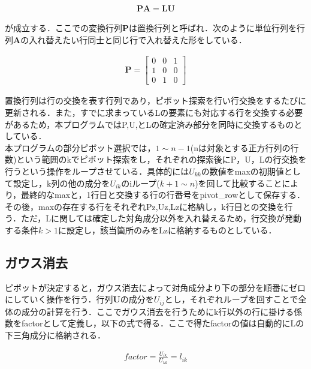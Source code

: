 \documentclass[dvipdfmx]{jsarticle}
\begin{document}
\begin{align}
    \boldsymbol{PA}=\boldsymbol{LU}
\end{align}

が成立する．ここでの変換行列$\boldsymbol{P}$は置換行列と呼ばれ．次のように単位行列を行列$\boldsymbol{A}$の入れ替えたい行同士と同じ行で入れ替えた形をしている．

\begin{align*}
    \boldsymbol{P}=
    \begin{bmatrix}
        0 & 0 & 1 \\
        1 & 0 & 0 \\
        0 & 1 & 0
    \end{bmatrix}
\end{align*}

置換行列は行の交換を表す行列であり，ピボット探索を行い行交換をするたびに更新される．また，すでに求まっているLの要素にも対応する行を交換する必要があるため，本プログラムではP,U,とLの確定済み部分を同時に交換するものとしている．\\

本プログラムの部分ピボット選択では，$1 \sim n-1$(nは対象とする正方行列の行数)という範囲のkでピボット探索をし，それぞれの探索後にP，U，Lの行交換を行うという操作をループさせている．具体的には$U_{kk}$の数値をmaxの初期値として設定し，k列の他の成分を$U_{ik}$のiループ($k+1 \sim n$)を回して比較することにより，最終的なmaxと，1行目と交換する行の行番号をpivot\_rowとして保存する．\\

その後，maxの存在する行をそれぞれPz,Uz,Lzに格納し，k行目との交換を行う．ただ，Lに関しては確定した対角成分以外を入れ替えるため，行交換が発動する条件$k>1$に設定し，該当箇所のみをLzに格納するものとしている．\\

\subsection{ガウス消去}
ピボットが決定すると，ガウス消去によって対角成分より下の部分を順番にゼロにしていく操作を行う．行列$\boldsymbol{U}$の成分を$U_{ij}$とし，それぞれループを回すことで全体の成分の計算を行う．ここでガウス消去を行うためにk行以外の行に掛ける係数をfactorとして定義し，以下の式で得る．ここで得たfactorの値は自動的にLの下三角成分に格納される．

\begin{align}
    factor=\frac{U_{ik}}{U_{kk}}=l_{ik}
\end{align}
\end{document}
